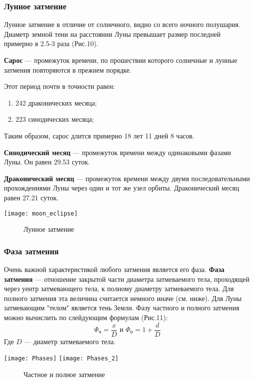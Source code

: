 \documentclass[10pt,a5paper]{article}
\begin{document}
\subsubsection*{Лунное затмение}

Лунное затмение в отличие от солнечного, видно со всего ночного полушария. Диаметр земной тени на расстоянии Луны превышает размер последней примерно в 2.5-3 раза (Рис.10).

\textbf{Сарос} --- промежуток  времени, по прошествии которого солнечные и лунные затмения повторяются в прежнем порядке.

Этот период почти в точности равен:
\begin{enumerate}
\item 242 драконических месяца;
\item 223 синодических месяца;
\end{enumerate}

Таким образом, сарос длится примерно 18 лет 11 дней 8 часов.

\textbf{Синодический месяц} --- промежуток времени между одинаковыми фазами Луны. Он равен 29.53 суток.

\textbf{Драконический месяц} --- промежуток времени между двумя последовательными прохождениями Луны через один и тот же узел орбиты. Драконический месяц равен 27.21 суток.
\begin{center}
\texttt{[image: moon\_eclipse]}
\begin{figure}[h!]
\caption{Лунное затмение}
\end{figure}
\end{center}
\subsubsection*{Фаза затмения}
Очень важной характеристикой любого затмения является его фаза. \textbf{Фаза затмения} --- отношение закрытой части диаметра затмеваемого тела, проходящей через уентр затмевающего тела, к полному диаметру затмеваемого тела. Для полного затмения эта величина считается немного иначе (см. ниже). Для Луны затмевающим "телом" является тень Земли. Фазу частного и полного затмения можно вычислить по слейдующим формулам (Рис.11):
$$\Phi_{\text{ч}}=\frac{x}{D} \text{ и } \Phi_{\text{п}}=1+\frac{d}{D}$$
Где $D$ --- диаметр затмеваемого тела.
\begin{center}
\texttt{[image: Phases]}
\texttt{[image: Phases\_2]}
\begin{figure}[h!]
\caption{Частное и полное затмение}
\end{figure}
\end{center}
\end{document}
